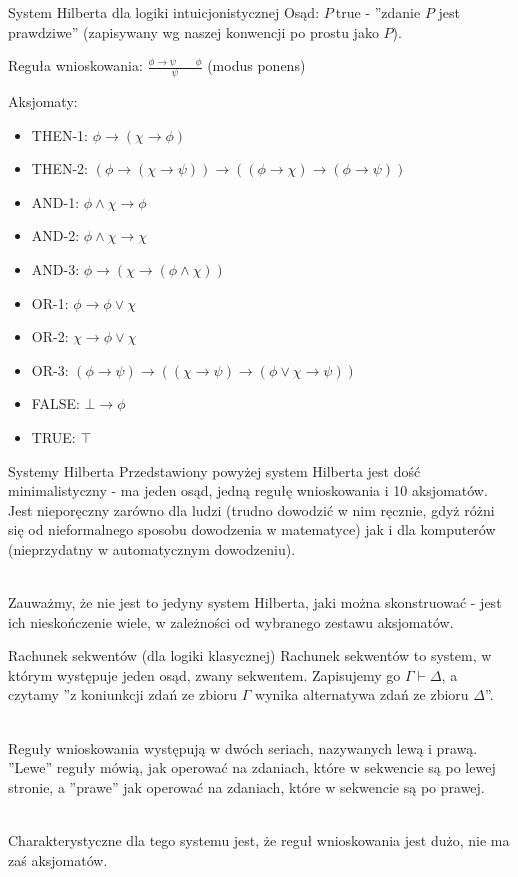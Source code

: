 \documentclass{beamer}
\renewcommand{\implies}{\rightarrow}
\begin{document}
\begin{frame}{System Hilberta dla logiki intuicjonistycznej}
	Osąd: $P \ \text{true}$ - ''zdanie $P$ jest prawdziwe'' (zapisywany wg naszej konwencji po prostu jako $P$).
	
	Reguła wnioskowania: $\displaystyle \frac{\phi \implies \psi \qquad \phi}{\psi}$ (modus ponens)
	
	Aksjomaty:

	\begin{itemize}
		\item THEN-1: $\phi \to (\chi \to \phi)$
		\item THEN-2: $(\phi \to (\chi \to \psi)) \to ((\phi \to \chi )\to (\phi \to \psi ))$
		\item AND-1: $\phi \land \chi \to \phi$
		\item AND-2: $\phi \land \chi \to \chi$
		\item AND-3: $\phi \to (\chi \to (\phi \land \chi))$
		\item OR-1: $\phi \to \phi \lor \chi$
		\item OR-2: $\chi \to \phi \lor \chi$
		\item OR-3: $(\phi \to \psi )\to ((\chi \to \psi )\to (\phi \lor \chi \to \psi ))$
		\item FALSE: $\bot \to \phi$
		\item TRUE: $\top$
	\end{itemize}
\end{frame}

\begin{frame}{Systemy Hilberta}
	Przedstawiony powyżej system Hilberta jest dość minimalistyczny - ma jeden osąd, jedną regułę wnioskowania i 10 aksjomatów. Jest nieporęczny zarówno dla ludzi (trudno dowodzić w nim ręcznie, gdyż różni się od nieformalnego sposobu dowodzenia w matematyce) jak i dla komputerów (nieprzydatny w automatycznym dowodzeniu). \\~\
	
	Zauważmy, że nie jest to jedyny system Hilberta, jaki można skonstruować - jest ich nieskończenie wiele, w zależności od wybranego zestawu aksjomatów. 
\end{frame}

\begin{frame}{Rachunek sekwentów (dla logiki klasycznej)}
	Rachunek sekwentów to system, w którym występuje jeden osąd, zwany sekwentem. Zapisujemy go $\Gamma \vdash \Delta$, a czytamy ''z koniunkcji zdań ze zbioru $\Gamma$ wynika alternatywa zdań ze zbioru $\Delta$''. \\~\
	
	Reguły wnioskowania występują w dwóch seriach, nazywanych lewą i prawą. ''Lewe'' reguły mówią, jak operować na zdaniach, które w sekwencie są po lewej stronie, a ''prawe'' jak operować na zdaniach, które w sekwencie są po prawej. \\~\
	
	Charakterystyczne dla tego systemu jest, że reguł wnioskowania jest dużo, nie ma zaś aksjomatów.
\end{frame}
\end{document}
